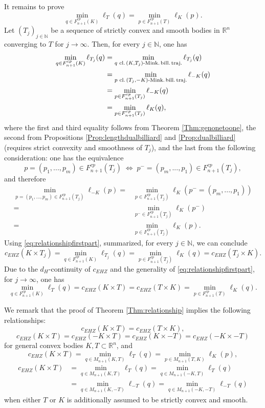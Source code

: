 \documentclass[12pt]{amsart}
\theoremstyle{plain}
\theoremstyle{remark}
\theoremstyle{definition}
\newcommand{\R}{\mathbb{R}}
\newcommand{\N}{\mathbb{N}}
\def\beqq{\begin{equation*}}\def\eeqq{\end{equation*}}
\begin{document}
It remains to prove
\beqq \min_{q\in F_{n+1}^{cp}(K)}\ell_T(q) = \min_{p\in F_{n+1}^{cp}(T)}\ell_K(p).\eeqq
Let $(T_j)_{j\in\N}$ be a sequence of strictly convex and smooth bodies in $\R^n$ converging to $T$ for $j\rightarrow\infty$. Then, for every $j\in\N$, one has 
\begin{align*}
\min_{q\in F_{n+1}^{cp}(K)}\ell_{T_j}(q) & = \min_{q \text{ cl.\,}(K,T_j)\text{-Mink.\,bill.\,traj.}} \ell_{T_j}(q)\\
&= \min_{p \text{ cl.\,}(T_j,-K)\text{-Mink.\,bill.\,traj.}} \ell_{-K}(q)\\
&= \min_{p\in F_{n+1}^{cp}(T_j)}\ell_{-K}(q)\\
&= \min_{p\in F_{n+1}^{cp}(T_j)}\ell_{K}(q),
\end{align*}
where the first and third equality follows from Theorem \ref{Thm:genonetoone}, the second from Propositions \ref{Prop:lengthdualbilliard} and \ref{Prop:dualbilliard} (requires strict convexity and smoothness of $T_j$), and the last from the following consideration: one has the equivalence
\beqq p=(p_1,...,p_m)\in F_{n+1}^{cp}(T_j)\;\Leftrightarrow\; p^-=(p_m,...,p_1)\in F_{n+1}^{cp}(T_j),\eeqq
and therefore
\begin{align*}
\min_{p=(p_1,...,p_m)\in F_{n+1}^{cp}(T_j)}\ell_{-K}(p)= &\min_{p\in F_{n+1}^{cp}(T_j)}\ell_{K}(p^-=(p_m,...,p_1))\\
=&\min_{p^-\in F_{n+1}^{cp}(T_j)}\ell_K(p^-)\\
=&\min_{p\in F_{n+1}^{cp}(T_j)}\ell_K(p).
\end{align*}
Using \eqref{eq:relationshipfirstpart}, summarized, for every $j\in\N$, we can conclude
\beqq c_{EHZ}(K\times T_j)= \min_{q\in F_{n+1}^{cp}(K)}\ell_{T_j}(q) = \min_{p\in F_{n+1}^{cp}(T_j)}\ell_{K}(q) = c_{EHZ}(T_j\times K).\eeqq
Due to the $d_H$-continuity of $c_{EHZ}$ and the generality of \eqref{eq:relationshipfirstpart}, for $j\rightarrow\infty$, one has
\beqq \min_{q\in F_{n+1}^{cp}(K)}\ell_{T}(q) = c_{EHZ}(K\times T) = c_{EHZ}(T\times K) = \min_{p\in F_{n+1}^{cp}(T)}\ell_{K}(q).\eeqq
\epf

We remark that the proof of Theorem \ref{Thm:relationship} implies the following relationships:
\beqq c_{EHZ}(K\times T) = c_{EHZ}(T\times K),\eeqq
\beqq c_{EHZ}(K\times T)=c_{EHZ}(-K\times T)=c_{EHZ}(K\times -T)=c_{EHZ}(-K\times -T)\eeqq
for general convex bodies $K,T\subset\R^n$, and
\beqq c_{EHZ}(K\times T)=\min_{q \in M_{n+1}(K,T)} \ell_{T}(q)=\min_{p \in M_{n+1}(T,K)} \ell_{K}(p),\eeqq
\begin{align*}
c_{EHZ}(K\times T)&=\min_{q \in M_{n+1}(K,T)} \ell_{T}(q)=\min_{q \in M_{n+1}(-K,T)} \ell_{T}(q)\\
&=\min_{q \in M_{n+1}(K,-T)} \ell_{-T}(q)=\min_{q \in M_{n+1}(-K,-T)} \ell_{-T}(q)
\end{align*}
when either $T$ or $K$ is additionally assumed to be strictly convex and smooth.
\end{document}
